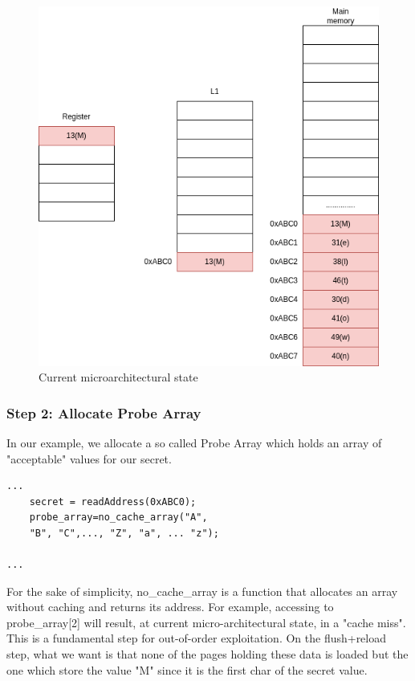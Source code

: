 \begin{figure}[!h]
    \includegraphics[scale=0.25]{img/meltdown-step-one.png}
    \caption{Current microarchitectural state}
\end{figure}


\subsubsection{Step 2: Allocate Probe Array}
In our example, we allocate a so called Probe Array which holds an array of "acceptable" values for our secret.
\begin{verbatim}
...
    secret = readAddress(0xABC0);
    probe_array=no_cache_array("A",
	"B", "C",..., "Z", "a", ... "z");

...
\end{verbatim}
For the sake of simplicity, no\_cache\_array is a function that allocates an array without caching and returns its address.
For example, accessing to probe\_array[2] will result, at current micro-architectural state, in a "cache miss".
This is a fundamental step for out-of-order exploitation.
On the flush+reload step, what we want is that none of the pages holding these data is loaded but the one which store the value
"M" since it is the first char of the secret value.

